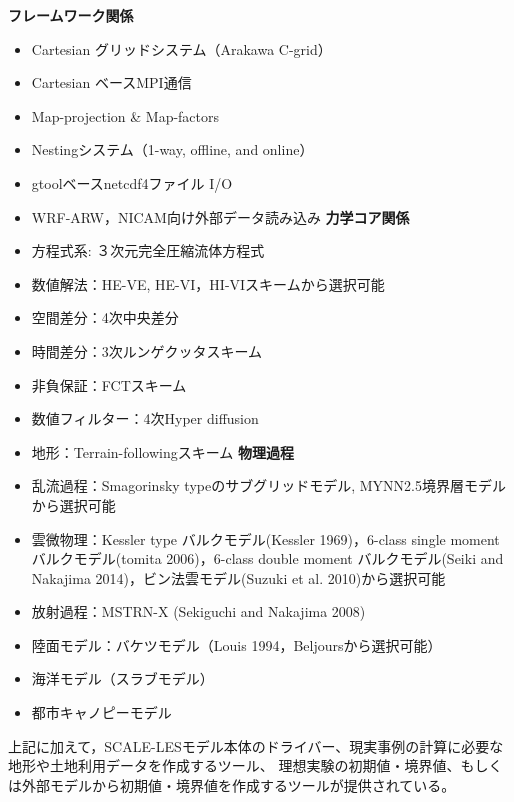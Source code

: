 {\bf フレームワーク関係}
\begin{itemize}
\item Cartesian グリッドシステム（Arakawa C-grid）
\item Cartesian ベースMPI通信
\item Map-projection \& Map-factors
\item Nestingシステム（1-way, offline, and online）
\item gtoolベースnetcdf4ファイル I/O
\item WRF-ARW，NICAM向け外部データ読み込み
{\bf 力学コア関係}
\item 方程式系: ３次元完全圧縮流体方程式
\item 数値解法：HE-VE,  HE-VI，HI-VIスキームから選択可能
\item 空間差分：4次中央差分
\item 時間差分：3次ルンゲクッタスキーム
\item 非負保証：FCTスキーム
\item 数値フィルター：4次Hyper diffusion
\item 地形：Terrain-followingスキーム
{\bf 物理過程}
\item 乱流過程：Smagorinsky typeのサブグリッドモデル, MYNN2.5境界層モデルから選択可能
\item 雲微物理：Kessler type バルクモデル(Kessler 1969)，6-class single moment バルクモデル(tomita 2006)，6-class double moment バルクモデル(Seiki and Nakajima 2014)，ビン法雲モデル(Suzuki et al. 2010)から選択可能
\item 放射過程：MSTRN-X (Sekiguchi and Nakajima 2008)
\item 陸面モデル：バケツモデル（Louis 1994，Beljoursから選択可能）
\item 海洋モデル（スラブモデル）
\item 都市キャノピーモデル
\end{itemize}

上記に加えて，SCALE-LESモデル本体のドライバー、現実事例の計算に必要な地形や土地利用データを作成するツール、
理想実験の初期値・境界値、もしくは外部モデルから初期値・境界値を作成するツールが提供されている。
